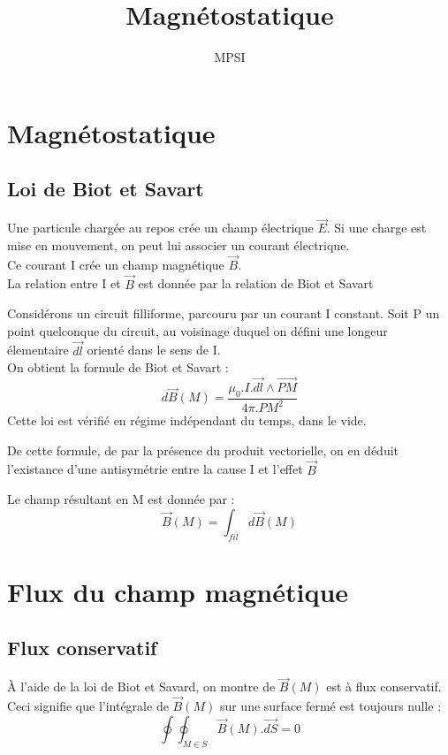 \title{Magnétostatique}
\author{MPSI}

\maketitle
\tableofcontents
\chapter{Magnétostatique}
\section{Loi de Biot et Savart}
Une particule chargée au repos crée un champ électrique $\overrightarrow{E}$. Si une charge est mise en mouvement, on peut lui associer un courant électrique.\\
Ce courant I crée un champ magnétique $\overrightarrow{B}$.\\
La relation entre I et $\overrightarrow{B}$ est donnée par la relation de Biot et Savart
\begin{theo}
Considérons un circuit filliforme, parcouru par un courant I constant. Soit P un point quelconque du circuit, au voisinage duquel on défini une longeur élementaire $\overrightarrow{dl}$ orienté dans le sens de I.\\
On obtient la formule de Biot et Savart : 
$$d\overrightarrow{B}(M) = \dfrac{\mu_0.I.\overrightarrow{dl}\wedge\overrightarrow{PM}}{4\pi.PM^2}$$
Cette loi est vérifié en régime indépendant du temps, dans le vide.
\end{theo}
\begin{prop}
De cette formule, de par la présence du produit vectorielle, on en déduit l'existance d'une antisymétrie entre la cause I et l'effet $\overrightarrow{B}$
\end{prop}
\begin{prop}
Le champ résultant en M est donnée par : 
$$\overrightarrow{B}(M) = \int_{fil} d\overrightarrow{B}(M)$$ 
\end{prop}
\chapter{Flux du champ magnétique}
\section{Flux conservatif}
\begin{prop}
À l'aide de la loi de Biot et Savard, on montre de $\overrightarrow{B}(M)$ est à flux conservatif. Ceci signifie que l'intégrale de $\overrightarrow{B}(M)$ sur une surface fermé est toujours nulle : 
$$\oint\oint_{M \in S} \overrightarrow{B}(M).\overrightarrow{dS} = 0$$
\end{prop}
